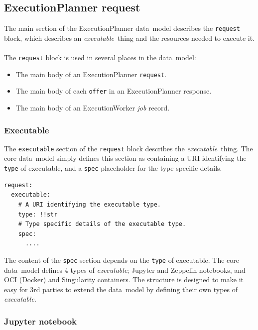 \documentclass[11pt,a4paper]{ivoa}
\newcommand{\datamodel} {data~model}
\newcommand{\execplanner} {ExecutionPlanner}
\newcommand{\execworker} {ExecutionWorker}
\newcommand{\jupyter} {Jupyter}
\newcommand{\zeppelin} {Zeppelin}
\newcommand{\singularity} {Singularity}
\newcommand{\codeword}[1] {\texttt{#1}}
\newcommand{\executable} {\textit{executable}}
\newcommand{\executablething} {\textit{executable}~thing}
\newcommand{\job} {\textit{job}}
\begin{document}
\subsection{\execplanner{} request}
\label{datamodel-request}

The main section of the \execplanner{} \datamodel{} describes the \codeword{request} block,
which describes an \executablething{} and the resources needed to execute it.
\\
\\
The \codeword{request} block is used in several places in the \datamodel{}:
\begin{itemize}
    \item The main body of an \execplanner{} \codeword{request}.
    \item The main body of each \codeword{offer} in an \execplanner{} response.
    \item The main body of an \execworker{} \job{} record.
\end{itemize}

\subsubsection{Executable}
\label{datamodel-executable}

The \codeword{executable} section of the \codeword{request} block describes the \executablething{}.
The core \datamodel{} simply defines this section as containing a URI identifying the \codeword{type} of executable,
and a \codeword{spec} placeholder for the type specific details.

\begin{lstlisting}[]
request:
  executable:
    # A URI identifying the executable type.
    type: !!str
    # Type specific details of the executable type.
    spec:
      ....
\end{lstlisting}

The content of the \codeword{spec} section depends on the \codeword{type} of executable.
The core \datamodel{} defines 4 types of \executable{};
\jupyter{} and \zeppelin{} notebooks, and OCI (Docker) and \singularity{} containers.
The structure is designed to make it easy for 3rd parties to extend the \datamodel{}
by defining their own types of \executable{}.

\subsubsection{Jupyter notebook}
\label{datamodel-jupyter-notebook}
\end{document}
